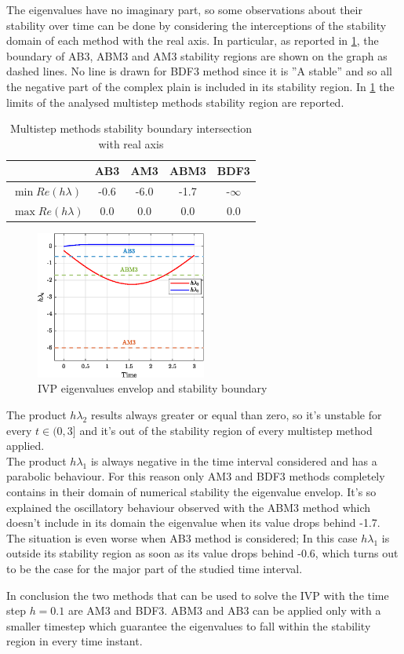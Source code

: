 \documentclass[11pt,a4paper,oneside]{article}
\begin{document}
The eigenvalues have no imaginary part, so some observations about their stability over time can be done by considering the interceptions of the stability domain of each method with the real axis.
In particular, as reported in \cref{fig:ex7_eig}, the boundary of AB3, ABM3 and AM3 stability regions are shown on the graph as dashed lines.
No line is drawn for BDF3 method since it is ''A stable'' and so all the negative part of the complex plain is included in its stability region.
In \cref{tab:ex7_stabLim} the limits of the analysed multistep methods stability region are reported.
\begin{table}[htb]
    \centering
    \caption{Multistep methods stability boundary intersection with real axis}
    \label{tab:ex7_stabLim}
    \begin{tabular}{lcccc}
            \toprule
            \toprule
            & AB3 & AM3 & ABM3 & BDF3   \\ 
            \midrule
            $\min Re(h\lambda)$ & -0.6 & -6.0 & -1.7 & -$\infty$    \\
            $\max Re(h\lambda)$ & 0.0  & 0.0  & 0.0  & 0.0          \\
            \bottomrule
            \bottomrule
        \end{tabular}
\end{table}

\clearpage

\begin{figure}[htb]
    \centering
    \includegraphics*[width=0.5\textwidth, keepaspectratio]{ex7_eig.eps}
    \caption[]{\label{fig:ex7_eig} IVP eigenvalues envelop and stability boundary}
\end{figure}

The product $h\lambda_2$ results always greater or equal than zero, so it's unstable for every $t\in(0,3]$ and it's out of the stability region of every multistep method applied. \\
The product $h\lambda_1$ is always negative in the time interval considered and has a parabolic behaviour.
For this reason only AM3 and BDF3 methods completely contains in their domain of numerical stability the eigenvalue envelop.
It's so explained the oscillatory behaviour observed with the ABM3 method which doesn't include in its domain the eigenvalue when its value drops behind -1.7.
The situation is even worse when AB3 method is considered; In this case $h\lambda_1$ is outside its stability region as soon as its value drops behind -0.6, which turns out to be the case for the major part of the studied time interval.

In conclusion the two methods that can be used to solve the IVP with the time step $h=0.1$ are AM3 and BDF3. ABM3 and AB3 can be applied only with a smaller timestep which guarantee the eigenvalues to fall within the stability region in every time instant.

\clearpage
\end{document}

